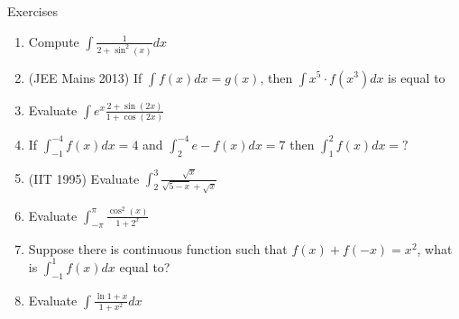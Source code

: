 \begin{xcb}{Exercises}
\begin{enumerate}
    \item Compute $\int \frac{1}{2+\sin^2(x)} dx$
    \item (JEE Mains 2013)  If $\int f(x) dx = g(x)$, then $\int x^5\cdot f(x^3) dx$ is equal to 
    \item Evaluate $\int e^x \frac{2+\sin(2x)}{1+\cos(2x)}$
    \item If $\int^{-4}_{-1}f(x)dx=4$ and $\int^{-4}_{2}e-f(x)dx=7$ then $\int^{2}_{1}f(x)dx=?$
    \item (IIT 1995) Evaluate $\int^3_2\frac{\sqrt{x}}{\sqrt{5-x}+\sqrt{x}}$
    \item Evaluate $\int^{\pi}_{-\pi}\frac{\cos^2(x)}{1+2^x}$
    \item Suppose there is continuous function such that $f(x)+f(-x)=x^2$, what is $\int^{1}_{-1}f(x)dx$ equal to?
    \item Evaluate $\int \frac{\ln{1+x}}{1+x^2}dx$
\end{enumerate}
\end{xcb}